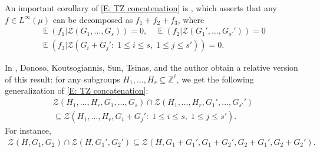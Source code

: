 \documentclass[11pt]{amsart}
\theoremstyle{definition}
\DeclareMathOperator*{\E}{\mathbb{E}}
\newcommand{\Z}{{\mathbb Z}}
\newcommand{\CZ}{{\mathcal Z}}
\newcommand{\1}{{\mathbf{1}}}
\begin{document}
An important corollary of \eqref{E: TZ concatenation} is \cite[Corollary 1.21]{TZ16}, which asserts that any $f\in L^\infty(\mu)$ can be decomposed as $f_1 +f_2+f_3$, where 
\begin{gather*}
    \E(f_1|\CZ(G_1, \ldots, G_s)) = 0,\quad 
    \E(f_2|\CZ(G_1', \ldots, G_{s'}'))=0\\
    \E(f_3|\CZ(G_i + G_j'\colon\; 1\leq i\leq s,\; 1\leq j\leq s')) = 0.
\end{gather*}

In \cite[Theorem 3.1]{DKKST25}, Donoso, Koutsogiannis, Sun, Tsinas, and the author obtain a relative version of this result: for any subgroups $H_1, \ldots, H_r\subseteq \Z^\ell$, we get the following generalization of \eqref{E: TZ concatenation}:
\begin{multline}\label{E: DKKST concatenation}
    \CZ(H_1, \ldots, H_r, G_1, \ldots, G_s) \cap \CZ(H_1, \ldots, H_r, G_1', \ldots, G_{s'}')\\
    \subseteq \CZ(H_1, \ldots, H_r, G_i + G_j'\colon\; 1\leq i\leq s,\; 1\leq j\leq s').
\end{multline}
For instance,
\begin{align*}
        \CZ(H, G_1, G_2)\cap\CZ(H, G_1', G_2')\subseteq \CZ(H, G_1 + G_1', G_1 + G_2', G_2+G_1', G_2+G_2').
\end{align*}
\end{document}
